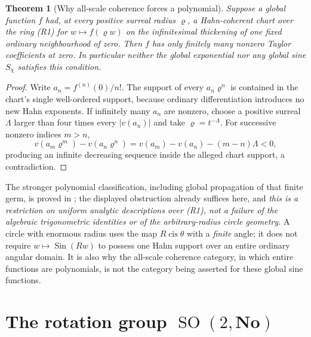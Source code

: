 \documentclass[11pt,letterpaper]{article}
\numberwithin{equation}{section}
\newtheorem{theorem}{Theorem}[section]
\theoremstyle{definition}
\theoremstyle{remark}
\newcommand{\No}{\mathbf{No}}
\newcommand{\cis}{\operatorname{cis}}
\newcommand{\Sin}{\operatorname{Sin}}
\newcommand{\SO}{\operatorname{SO}}
\begin{document}
\begin{theorem}[Why all-scale coherence forces a polynomial]\label{trigonometry:thm:allscale}
Suppose a global function $f$ had, at \emph{every} positive surreal radius $\varrho$, a
Hahn-coherent chart over the ring (R1) for $w\mapsto f(\varrho w)$ on the infinitesimal thickening
of one fixed ordinary neighbourhood of zero. Then $f$ has only finitely many nonzero Taylor
coefficients at zero. In particular neither the global exponential nor any global sine $S_\chi$
satisfies this condition.
\end{theorem}
\begin{proof}
Write $a_n=f^{(n)}(0)/n!$. The support of every $a_n\varrho^n$ is contained in the chart's single
well-ordered support, because ordinary differentiation introduces no new Hahn exponents. If
infinitely many $a_n$ are nonzero, choose a positive surreal $\mathit\Lambda$ larger than four
times every $|v(a_n)|$ and take $\varrho=t^{-\mathit\Lambda}$. For successive nonzero indices
$m>n$,
\[
 v(a_m\varrho^m)-v(a_n\varrho^n)=v(a_m)-v(a_n)-(m-n)\mathit\Lambda<0,
\]
producing an infinite decreasing sequence inside the alleged chart support, a contradiction.
\end{proof}
The stronger polynomial classification, including global propagation of that finite germ, is proved
in \cite{SourceAnalysis}; the displayed obstruction already suffices here, and \emph{this is a
restriction on uniform analytic descriptions over (R1), not a failure of the algebraic
trigonometric identities or of the arbitrary-radius circle geometry.} A circle with enormous radius
uses the map $R\cis\theta$ with a \emph{finite} angle; it does not require $w\mapsto\Sin(Rw)$ to
possess one Hahn support over an entire ordinary angular domain. It is also why the all-scale
coherence category, in which entire functions are polynomials, is not the category being asserted
for these global sine functions.

\section{The rotation group \texorpdfstring{$\SO(2,\No)$}{SO(2,No)}}\label{trigonometry:rot:sec:main}
\end{document}
